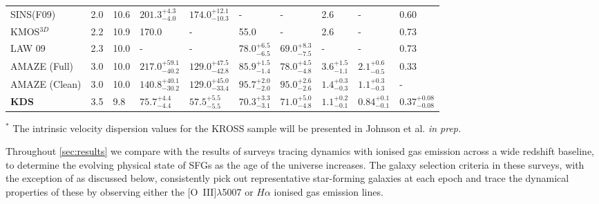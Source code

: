 \documentclass[fleqn,usenatbib]{mnras}
\newcommand{\cmark}{\ding{51}}%
\newcommand{\xmark}{\ding{55}}%
\begin{document}
\begin{table*}
\begin{threeparttable}
\begin{tabular}{llllllllll}
 SINS(F09) & 2.0 & 10.6 &       $201.3^{+4.3}_{-4.0}$  \cmark & $174.0^{+12.1}_{-10.3}$ &  -                    \xmark & -                    & 2.6                  \xmark &           -                   &               0.60                    \xmark   \\[1ex]
 KMOS$^{3D}$ & 2.2 & 10.9 &     170.0                  \xmark & -                       &  55.0                 \xmark & -                    & 2.6                  \xmark &           -                   &               0.73                    \xmark   \\[1ex]
 LAW 09 & 2.3 & 10.0 &          -                      \xmark & -                       &  $78.0^{+6.5}_{-6.5}$ \xmark & $69.0^{+8.3}_{-7.5}$ & -                    \xmark &           -                   &               0.73                    \xmark   \\[1ex]
 AMAZE (Full) & 3.0 & 10.0 &    $217.0^{+59.1}_{-40.2}$\xmark & $129.0^{+47.5}_{-42.8}$ &  $85.9^{+1.5}_{-1.4}$ \xmark & $78.0^{+4.5}_{-4.8}$ & $3.6^{+1.5}_{-1.1}$  \xmark &           $2.1^{+0.6}_{-0.5}$ &               0.33                    \xmark   \\[1ex]
 AMAZE (Clean) & 3.0 & 10.0 &   $140.8^{+40.1}_{-30.2}$\cmark & $129.0^{+45.0}_{-33.4}$ &  $95.7^{+2.0}_{-2.0}$ \cmark & $95.0^{+2.6}_{-2.6}$ & $1.4^{+0.3}_{-0.3}$  \cmark &           $1.1^{+0.3}_{-0.3}$ &               -                       \xmark   \\[1ex]
 \textbf{KDS} & 3.5 & 9.8 &     $75.7^{+4.4}_{-4.4}$   \cmark & $57.5^{+5.5}_{-5.5}$    &  $70.3^{+3.3}_{-3.1}$ \cmark & $71.0^{+5.0}_{-4.8}$ & $1.1^{+0.2}_{-0.1}$  \cmark &            $0.84^{+0.1}_{-0.1}$&               $0.37^{+0.08}_{-0.08}$ \cmark    \\[1ex]
 \hline
\end{tabular}
\begin{tablenotes}
      \small
      \item $^{*}$ The intrinsic velocity dispersion values for the KROSS sample will be presented in Johnson et al. {\it in prep.} 
    \end{tablenotes}
  \end{threeparttable}
  \end{table*}

Throughout \cref{sec:results} we compare with the results of surveys tracing dynamics with ionised gas emission across a wide redshift baseline, to determine the evolving physical state of SFGs as the age of the universe increases.
The galaxy selection criteria in these surveys, with the exception of \cite{Green2014} as discussed below, consistently pick out representative star-forming galaxies at each epoch and trace the dynamical properties of these by observing either the [O~{\sc III}]$\lambda$5007 or $H\alpha$ ionised gas emission lines.
\end{document}
